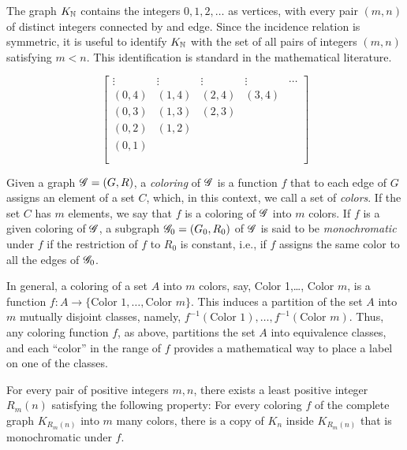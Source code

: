 The graph $K_{\mathbb{N}}$ contains the integers $0, 1, 2, \dots$ as vertices, with every pair $(m,n)$ of distinct integers  connected by and edge. Since the incidence relation is symmetric, it is useful to identify $K_{\mathbb{N}}$ with the set of all pairs of integers $(m,n)$ satisfying $m<n$. This identification is standard in the mathematical literature.


\[
\begin{bmatrix}
\vdots &\vdots &\vdots &\vdots & \cdots \\
(0,4) &(1,4) &(2,4) &(3,4) &\\
(0,3) &(1,3) &(2,3) & &\\
(0,2) &(1,2)  & & &\\
(0,1) & & &\\
        & & & &\\
\end{bmatrix}
\]


\begin{definition}
Given a graph  $\mathscr{G}=(G,R)$, a \emph{coloring} of $\mathscr{G}$ is a function $f$ that to each edge of $G$ assigns an element of a set $C$, which, in this context, we call a set of \emph{colors}. If the set $C$ has $m$ elements, we say that $f$ is a coloring of $\mathscr{G}$ into $m$ colors. If $f$ is a given coloring of $\mathscr{G}$, a subgraph  $\mathscr{G}_0=(G_0,R_0)$ of $\mathscr{G}$ is said to be \emph{monochromatic} under $f$ if the restriction of $f$ to $R_0$ is constant, i.e., if $f$ assigns the same color to all the edges of $\mathscr{G}_0$.
\end{definition}


In general, a coloring of a set $A$ into $m$ colors, say, Color 1,\dots , Color $m$, is a function 
$f \colon A\to \{\text{Color 1},\dots, \text{Color $m$}\}$. This induces a partition of the set $A$ into $m$ mutually disjoint classes, namely, $f^{-1}(\text{Color 1}),\dots, f^{-1}(\text{Color $m$})$. Thus, any coloring function $f$, as above, partitions the set $A$ into equivalence classes, and each ``color'' in the range of $f$ provides a mathematical way to place a label on one of the classes.  


\begin{theorem}
\label{T:Ramsey classical}
For every pair of positive integers $m,n$, there exists a least positive integer $R_m(n)$ satisfying the following property: For every coloring $f$ of the complete graph $K_{R_m(n)}$ into $m$ many colors, there is a copy of $K_n$ inside $K_{R_m(n)}$ that is monochromatic under $f$.
\end{theorem}


